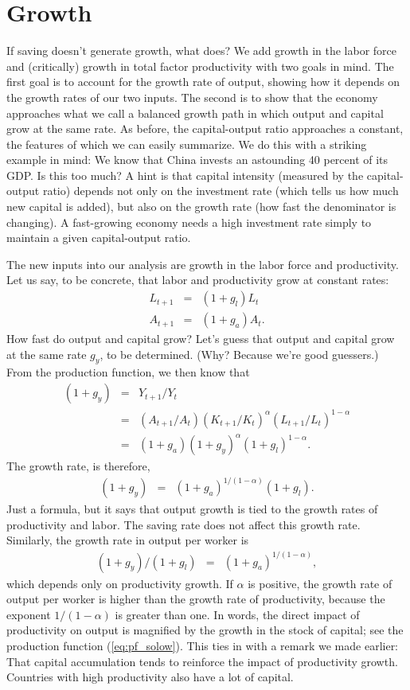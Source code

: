 \section{Growth}

If saving doesn't generate growth, what does?
We add growth in the labor force and
(critically) growth in total factor productivity
with two goals in mind.
The first goal is to account for the growth rate of output,
showing how it depends on the growth rates of our two inputs.
The second is to show that the economy approaches
what we call a balanced growth path in which
output and capital grow at the same rate.
As before, the capital-output ratio approaches a constant,
the features of which we can easily summarize.
We do this with a striking example in mind:
We know that China invests an astounding 40 percent of its GDP.
Is this too much?
A hint is that capital intensity
(measured by the capital-output ratio)
depends not only on the investment rate (which tells us how
much new capital is added), but also on the growth rate
(how fast the denominator is changing).
A fast-growing economy needs a high investment rate
simply to maintain a given capital-output ratio.


The new inputs into our analysis are growth in the labor force
and productivity.
Let us say, to be concrete,
that labor and productivity grow
at constant rates:
\begin{eqnarray*}
    L_{t+1} &=&  (1+g_l) L_t \\
    A_{t+1} &=&  (1+g_a) A_t .
\end{eqnarray*}
How fast do output and capital grow?
Let's guess that output and capital grow at the same rate $g_y$,
to be determined.
(Why?  Because we're good guessers.)
From the production function, we then know that
\begin{eqnarray*}
    (1+g_y)       &=& Y_{t+1}/Y_t  \\
                &=&  (A_{t+1}/A_t) (K_{t+1}/K_t)^\alpha
                        (L_{t+1}/L_t)^{1-\alpha} \\
                &=& (1+g_a) (1+g_y)^{\alpha} (1+g_l)^{1-\alpha} .
\end{eqnarray*}
The growth rate, is therefore,
\begin{eqnarray*}
    (1+g_y)       &=& (1+g_a)^{1/(1-\alpha)} (1+g_l) .
\end{eqnarray*}
Just a formula, but it says that output growth is tied
to the growth rates of productivity and labor.
The saving rate does not affect this growth rate.
Similarly, the growth rate in output per worker is
\begin{eqnarray*}
    (1+g_y)/(1+g_l)     &=& (1+g_a)^{1/(1-\alpha)} ,
\end{eqnarray*}
which depends only on productivity growth.
If $\alpha$ is positive,
the growth rate of output per worker is
higher than the growth rate of productivity,
because the exponent $ 1/(1-\alpha)$ is greater than one.
In words, the direct impact of productivity on output
is magnified by the growth in the stock of capital;
see the production function (\ref{eq:pf_solow}).
This ties in with a remark we made earlier: That capital accumulation
tends to reinforce the impact of productivity growth.
Countries with high productivity also have a lot of capital.


